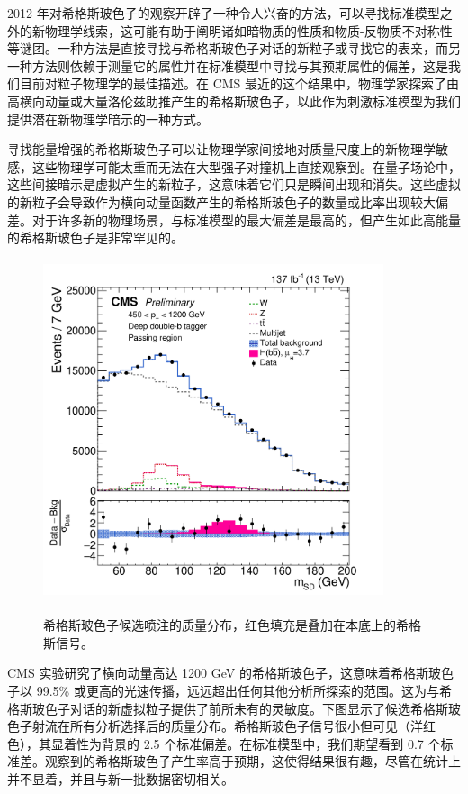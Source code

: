 2012 年对希格斯玻色子的观察开辟了一种令人兴奋的方法，可以寻找标准模型之外的新物理学线索，这可能有助于阐明诸如暗物质的性质和物质-反物质不对称性等谜团。一种方法是直接寻找与希格斯玻色子对话的新粒子或寻找它的表亲，而另一种方法则依赖于测量它的属性并在标准模型中寻找与其预期属性的偏差，这是我们目前对粒子物理学的最佳描述。在 CMS 最近的这个结果中，物理学家探索了由高横向动量或大量洛伦兹助推产生的希格斯玻色子，以此作为刺激标准模型为我们提供潜在新物理学暗示的一种方式。

寻找能量增强的希格斯玻色子可以让物理学家间接地对质量尺度上的新物理学敏感，这些物理学可能太重而无法在大型强子对撞机上直接观察到。在量子场论中，这些间接暗示是虚拟产生的新粒子，这意味着它们只是瞬间出现和消失。这些虚拟的新粒子会导致作为横向动量函数产生的希格斯玻色子的数量或比率出现较大偏差。对于许多新的物理场景，与标准模型的最大偏差是最高的，但产生如此高能量的希格斯玻色子是非常罕见的。

\begin{figure}[H]
 \centering
 \caption{希格斯玻色子候选喷注的质量分布，红色填充是叠加在本底上的希格斯信号。}
 \includegraphics[height=10cm, width=10cm]{pictures/CMS-PAS-HIG-19-003_Figure_001-b.png}
 \label{fig:2.3}
\end{figure}

CMS 实验研究了横向动量高达 1200 GeV 的希格斯玻色子，这意味着希格斯玻色子以 99.5\% 或更高的光速传播，远远超出任何其他分析所探索的范围。这为与希格斯玻色子对话的新虚拟粒子提供了前所未有的灵敏度。下图显示了候选希格斯玻色子射流在所有分析选择后的质量分布。希格斯玻色子信号很小但可见（洋红色），其显着性为背景的 2.5 个标准偏差。在标准模型中，我们期望看到 0.7 个标准差。观察到的希格斯玻色子产生率高于预期，这使得结果很有趣，尽管在统计上并不显着，并且与新一批数据密切相关。 

